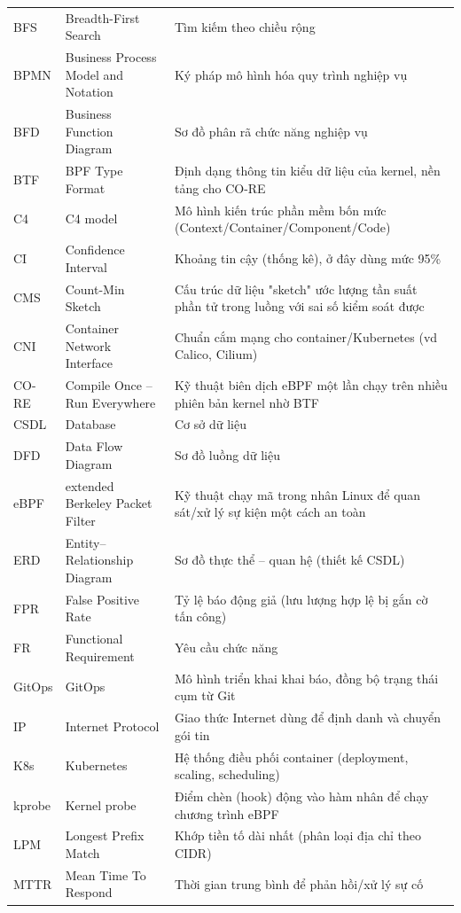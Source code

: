 \begin{longtable}{@{}p{3.0cm} >{\raggedright\arraybackslash}p{6cm} >{\raggedright\arraybackslash}p{5.5cm}@{}}
BFS     & Breadth-First Search & Tìm kiếm theo chiều rộng \\
BPMN    & Business Process Model and Notation & Ký pháp mô hình hóa quy trình nghiệp vụ \\
BFD     & Business Function Diagram & Sơ đồ phân rã chức năng nghiệp vụ \\
BTF     & BPF Type Format & Định dạng thông tin kiểu dữ liệu của kernel, nền tảng cho CO-RE \\
C4      & C4 model & Mô hình kiến trúc phần mềm bốn mức (Context/Container/Component/Code) \\
CI      & Confidence Interval & Khoảng tin cậy (thống kê), ở đây dùng mức 95\% \\
CMS     & Count-Min Sketch & Cấu trúc dữ liệu "sketch" ước lượng tần suất phần tử trong luồng với sai số kiểm soát được \\
CNI     & Container Network Interface & Chuẩn cắm mạng cho container/Kubernetes (vd Calico, Cilium) \\
CO-RE   & Compile Once -- Run Everywhere & Kỹ thuật biên dịch eBPF một lần chạy trên nhiều phiên bản kernel nhờ BTF \\
CSDL    & Database & Cơ sở dữ liệu \\
DFD     & Data Flow Diagram & Sơ đồ luồng dữ liệu \\
eBPF    & extended Berkeley Packet Filter & Kỹ thuật chạy mã trong nhân Linux để quan sát/xử lý sự kiện một cách an toàn \\
ERD     & Entity--Relationship Diagram & Sơ đồ thực thể -- quan hệ (thiết kế CSDL) \\
FPR     & False Positive Rate & Tỷ lệ báo động giả (lưu lượng hợp lệ bị gắn cờ tấn công) \\
FR      & Functional Requirement & Yêu cầu chức năng \\
GitOps  & GitOps & Mô hình triển khai khai báo, đồng bộ trạng thái cụm từ Git \\
IP      & Internet Protocol & Giao thức Internet dùng để định danh và chuyển gói tin \\
K8s     & Kubernetes & Hệ thống điều phối container (deployment, scaling, scheduling) \\
kprobe  & Kernel probe & Điểm chèn (hook) động vào hàm nhân để chạy chương trình eBPF \\
LPM     & Longest Prefix Match & Khớp tiền tố dài nhất (phân loại địa chỉ theo CIDR) \\
MTTR    & Mean Time To Respond & Thời gian trung bình để phản hồi/xử lý sự cố \\

\end{longtable}
